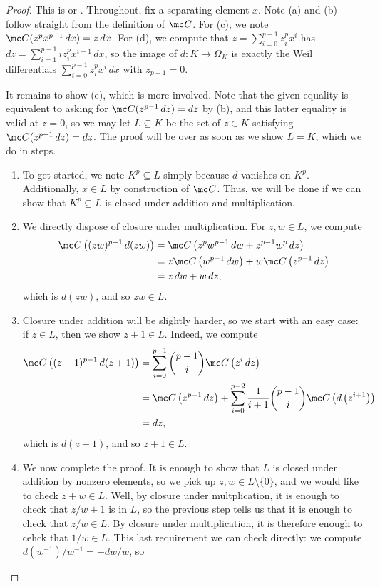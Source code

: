 \documentclass[../thesis.tex]{subfiles}
\begin{document}
\begin{proof}
	This is \cite[Exercise~4.12]{stich-function-fields} or \cite[Proposition~8]{serre-cartier-manin}. Throughout, fix a separating element $x$. Note (a) and (b) follow straight from the definition of $\mc C$. For (c), we note $\mc C(z^px^{p-1}\,dx)=z\,dx$. For (d), we compute that $z=\sum_{i=0}^{p-1}z_i^px^i$ has $dz=\sum_{i=1}^{p-1}iz_i^px^{i-1}\,dx$, so the image of $d\colon K\to\Omega_K$ is exactly the Weil differentials $\sum_{i=0}^{p-1}z_i^px^i\,dx$ with $z_{p-1}=0$.

	It remains to show (e), which is more involved. Note that the given equality is equivalent to asking for $\mc C(z^{p-1}\,dz)=dz$ by (b), and this latter equality is valid at $z=0$, so we may let $L\subseteq K$ be the set of $z\in K$ satisfying $\mc C(z^{p-1}\,dz)=dz$. The proof will be over as soon as we show $L=K$, which we do in steps.
	\begin{enumerate}
		\item To get started, we note $K^p\subseteq L$ simply because $d$ vanishes on $K^p$. Additionally, $x\in L$ by construction of $\mc C$. Thus, we will be done if we can show that $K^p\subseteq L$ is closed under addition and multiplication.
		\item We directly dispose of closure under multiplication. For $z,w\in L$, we compute
		\begin{align*}
			\mc C\left((zw)^{p-1}\,d(zw)\right) &= \mc C\left(z^pw^{p-1}\,dw+z^{p-1}w^p\,dz\right) \\
			&= z\mc C\left(w^{p-1}\,dw\right)+w\mc C\left(z^{p-1}\,dz\right) \\
			&= z\,dw+w\,dz,
		\end{align*}
		which is $d(zw)$, and so $zw\in L$.
		\item Closure under addition will be slightly harder, so we start with an easy case: if $z\in L$, then we show $z+1\in L$. Indeed, we compute
		\begin{align*}
			\mc C\left((z+1)^{p-1}\,d(z+1)\right) &= \sum_{i=0}^{p-1}\binom{p-1}i\mc C\left(z^i\,dz\right) \\
			&= \mc C\left(z^{p-1}\,dz\right)+\sum_{i=0}^{p-2}\frac1{i+1}\binom{p-1}i\mc C\left(d\left(z^{i+1}\right)\right) \\
			&= dz,
		\end{align*}
		which is $d(z+1)$, and so $z+1\in L$.
		\item We now complete the proof. It is enough to show that $L$ is closed under addition by nonzero elements, so we pick up $z,w\in L\setminus\{0\}$, and we would like to check $z+w\in L$. Well, by closure under multplication, it is enough to check that $z/w+1$ is in $L$, so the previous step tells us that it is enough to check that $z/w\in L$. By closure under multiplication, it is therefore enough to cehck that $1/w\in L$. This last requirement we can check directly: we compute $d\left(w^{-1}\right)/w^{-1}=-dw/w$, so

\end{enumerate}
\end{proof}
\end{document}
